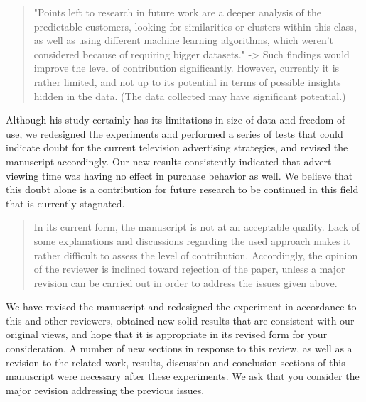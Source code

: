 \documentclass[review]{elsarticle}
\begin{document}
\begin{quotation}
"Points left to research in future work are a deeper analysis of the predictable customers, looking for similarities or clusters within this class, as well as using different machine learning algorithms, which weren’t considered because of requiring bigger datasets." -> Such findings would improve the level of contribution significantly. However, currently it is rather limited, and not up to its potential in terms of possible insights hidden in the data. (The data collected may have significant potential.)
\end{quotation}

Although his study certainly has its limitations in size of data and freedom of use, we redesigned the experiments and performed a series of tests that could indicate doubt for the current television advertising strategies, and revised the manuscript accordingly. Our new results consistently indicated that advert viewing time was having no effect in purchase behavior as well. We believe that this doubt alone is a contribution for future research to be continued in this field that is currently stagnated.

\begin{quotation}
In its current form, the manuscript is not at an acceptable quality. Lack of some explanations and discussions regarding the used approach makes it rather difficult to assess the level of contribution. Accordingly, the opinion of the reviewer is inclined toward rejection of the paper, unless a major revision can be carried out in order to address the issues given above.
\end{quotation}

We have revised the manuscript and redesigned the experiment in accordance to this and other reviewers, obtained new solid results that are consistent with our original views, and hope that it is appropriate in its revised form for your consideration. A number of new sections in response to this review, as well as a revision to the related work, results, discussion and conclusion sections of this manuscript were necessary after these experiments. We ask that you consider the major revision addressing the previous issues.
\end{document}
